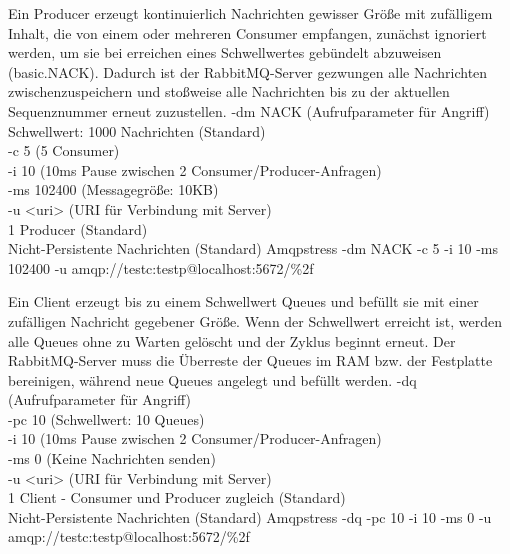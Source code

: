 \documentclass[	a4paper,
			11pt,
			titlepage,
			oneside,
			fleqn,
			listof=totoc,
			parskip,
			chapterprefix=false,
			numbers=noenddot]{scrartcl}
\begin{document}
\clearpage	
		{Ein Producer erzeugt kontinuierlich Nachrichten gewisser Größe mit zufälligem Inhalt, die von einem oder mehreren Consumer empfangen, zunächst ignoriert werden, um sie bei erreichen eines Schwellwertes gebündelt abzuweisen (basic.NACK). Dadurch ist der RabbitMQ-Server gezwungen alle Nachrichten zwischenzuspeichern und stoßweise alle Nachrichten bis zu der aktuellen Sequenznummer erneut zuzustellen.}%
		{%
		 -dm NACK (Aufrufparameter für Angriff) \\
		 Schwellwert: 1000 Nachrichten (Standard) \\
		 -c 5 (5 Consumer) \\
		 -i 10 (10ms Pause zwischen 2 Consumer/Producer-Anfragen) \\
		 -ms 102400 (Messagegröße: 10KB) \\
		 -u <uri> (URI für Verbindung mit Server) \\
		 1 Producer (Standard) \\
		 Nicht-Persistente Nachrichten (Standard)
		}%
		{Amqpstress -dm NACK -c 5 -i 10 -ms 102400 -u amqp://testc:testp@localhost:5672/\%2f}%
		{}
		
\clearpage
		{Ein Client erzeugt bis zu einem Schwellwert Queues und befüllt sie mit einer zufälligen Nachricht gegebener Größe. Wenn der Schwellwert erreicht ist, werden alle Queues ohne zu Warten gelöscht und der Zyklus beginnt erneut. Der RabbitMQ-Server muss die Überreste der Queues im RAM bzw. der Festplatte bereinigen, während neue Queues angelegt und befüllt werden.}%
		{%
		 -dq (Aufrufparameter für Angriff) \\
		 -pc 10 (Schwellwert: 10 Queues) \\
		 -i 10 (10ms Pause zwischen 2 Consumer/Producer-Anfragen) \\
		 -ms 0 (Keine Nachrichten senden) \\
		 -u <uri> (URI für Verbindung mit Server) \\
		 1 Client - Consumer und Producer zugleich (Standard) \\
		 Nicht-Persistente Nachrichten (Standard)
		}%
		{Amqpstress -dq -pc 10 -i 10 -ms 0  -u amqp://testc:testp@localhost:5672/\%2f}%
		{}
\end{document}
